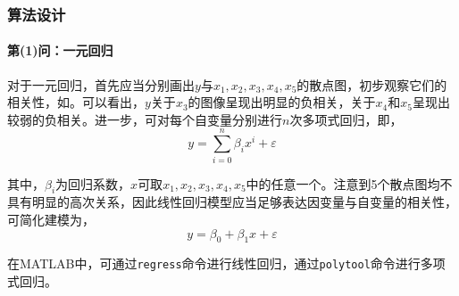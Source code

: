 
\subsubsection{算法设计}

\paragraph{第(1)问：一元回归} 对于一元回归，首先应当分别画出$y$与$x_1,x_2,x_3,x_4,x_5$的散点图，初步观察它们的相关性，如。可以看出，$y$关于$x_3$的图像呈现出明显的负相关，关于$x_4$和$x_5$呈现出较弱的负相关。进一步，可对每个自变量分别进行$n$次多项式回归，即，
\begin{equation}
    y = \sum_{i=0}^n \beta_i x^i + \varepsilon
\end{equation}

其中，$\beta_i$为回归系数，$x$可取$x_1,x_2,x_3,x_4,x_5$中的任意一个。注意到5个散点图均不具有明显的高次关系，因此线性回归模型应当足够表达因变量与自变量的相关性，可简化建模为，
\begin{equation}
    y = \beta_0 + \beta_1 x + \varepsilon
\end{equation}

在MATLAB中，可通过\texttt{regress}命令进行线性回归，通过\texttt{polytool}命令进行多项式回归。

